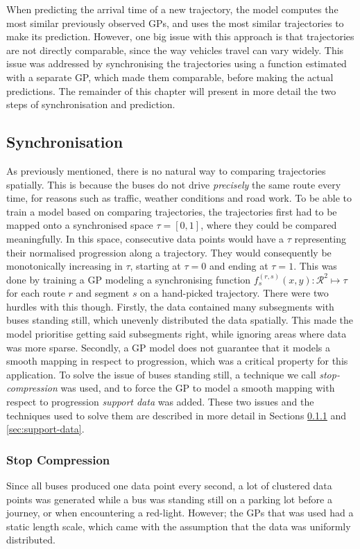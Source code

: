 When predicting the arrival time of a new trajectory, the model
computes the most similar previously observed GPs, and
uses the most similar trajectories to make its
prediction. However, one big issue with this approach is that
trajectories are not directly comparable, since
the way vehicles travel can vary widely. This issue
was addressed by synchronising the trajectories using a
function estimated with a separate GP, which made them comparable,
before making the actual predictions. The remainder of this chapter
will present in more detail the two steps of synchronisation and prediction.

\subsection{Synchronisation}
As previously mentioned, there is no natural way to comparing
trajectories spatially. This is because the buses do not drive
\textit{precisely} the same route every time, for reasons such as
traffic, weather conditions and road work. To be able to train a model
based on comparing trajectories, the trajectories first had to be
mapped onto a synchronised space $\tau = [0, 1]$, where they could be
compared meaningfully. In this space, consecutive data points would
have a $\tau$ representing their normalised progression along a
trajectory. They would consequently be monotonically increasing in
$\tau$, starting at $\tau=0$ and ending at $\tau=1$. This was done by
training a GP modeling a synchronising function $f^{(r,s)}_s(x, y) : \mathcal{R}^2 \mapsto
\tau$ for each route $r$ and segment $s$ on a hand-picked
trajectory. There were two hurdles with this though. Firstly, the data
contained many subsegments with buses standing still, which unevenly
distributed the data spatially. This made the model prioritise getting
said subsegments right, while ignoring areas where data was more
sparse. Secondly, a GP model does not guarantee that
it models a smooth mapping in respect to progression, which was a
critical property for this application. To solve the issue of buses
standing still, a technique we call \textit{stop-compression} was
used, and to force the GP to model a smooth mapping with respect to
progression \textit{support data} was added. These two issues and the techniques used to solve
them are described in more detail in
Sections \ref{sec:stop-compression} and \ref{sec:support-data}.

\subsubsection{Stop Compression}
\label{sec:stop-compression}
Since all buses produced one data point every second, a lot of
clustered data points was generated while a bus was standing still on
a parking lot before a journey, or when encountering a
red-light. However; the GPs that was used had a static length scale, which came with the assumption that the data was uniformly distributed.

